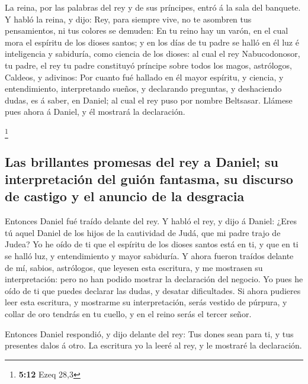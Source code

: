 La reina, por las palabras del rey y de sus príncipes,
entró á la sala del banquete. Y habló la reina, y dijo: Rey, para
siempre vive, no te asombren tus pensamientos, ni tus colores se
demuden:  En tu reino hay un varón, en el cual mora el
espíritu de los dioses santos; y en los días de tu padre se halló en él
luz é inteligencia y sabiduría, como ciencia de los dioses: al cual el
rey Nabucodonosor, tu padre, el rey tu padre constituyó príncipe sobre
todos los magos, astrólogos, Caldeos, y adivinos:  Por
cuanto fué hallado en él mayor espíritu, y ciencia, y entendimiento,
interpretando sueños, y declarando preguntas, y deshaciendo dudas, es á
saber, en Daniel; al cual el rey puso por nombre Beltsasar. Llámese pues
ahora á Daniel, y él mostrará la declaración.

\footnote{\textbf{5:12} Ezeq 28,3}

\hypertarget{las-brillantes-promesas-del-rey-a-daniel-su-interpretaciuxf3n-del-guiuxf3n-fantasma-su-discurso-de-castigo-y-el-anuncio-de-la-desgracia}{%
\subsection{Las brillantes promesas del rey a Daniel; su interpretación
del guión fantasma, su discurso de castigo y el anuncio de la
desgracia}\label{las-brillantes-promesas-del-rey-a-daniel-su-interpretaciuxf3n-del-guiuxf3n-fantasma-su-discurso-de-castigo-y-el-anuncio-de-la-desgracia}}

 Entonces Daniel fué traído delante del rey. Y habló el
rey, y dijo á Daniel: ¿Eres tú aquel Daniel de los hijos de la
cautividad de Judá, que mi padre trajo de Judea?  Yo he
oído de ti que el espíritu de los dioses santos está en ti, y que en ti
se halló luz, y entendimiento y mayor sabiduría.  Y ahora
fueron traídos delante de mí, sabios, astrólogos, que leyesen esta
escritura, y me mostrasen su interpretación: pero no han podido mostrar
la declaración del negocio.  Yo pues he oído de ti que
puedes declarar las dudas, y desatar dificultades. Si ahora pudieres
leer esta escritura, y mostrarme su interpretación, serás vestido de
púrpura, y collar de oro tendrás en tu cuello, y en el reino serás el
tercer señor.

 Entonces Daniel respondió, y dijo delante del rey: Tus
dones sean para ti, y tus presentes dalos á otro. La escritura yo la
leeré al rey, y le mostraré la declaración.

